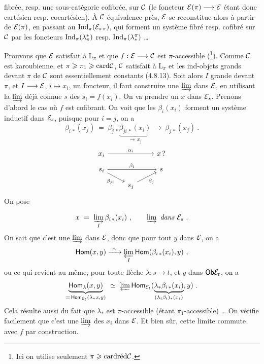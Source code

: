 fibrée, resp. une sous-catégorie cofibrée, sur $\cC$ (le foncteur $\cE(\pi) \longrightarrow \cE$ étant donc cartésien resp. cocartésien). À $\cC$-équivalence près, $\cE$ se reconstitue alors à partir de $\cE(\pi)$, en passant au $\Ind_{\pi}(\cE_{s\,\pi})$, qui forment un système fibré resp. cofibré sur $\cC$ par les foncteurs $\Ind_{\pi}(\lambda^*_{\pi})$ resp. $\Ind_{\pi}(\lambda^{\pi}_*)$ \dots

Prouvons que $\cE$ satisfait à $\mathrm{L}_{\pi}$ et que $f : \cE \longrightarrow \cC$ est $\pi$-accessible (\footnote[182]{Ici on utilise seulement $\pi \geqslant \card \red \cC$.}). Comme $\cC$ est karoubienne, et $\pi \geqslant \pi_1 \geqslant \card \cC$, $\cC$ satisfait à $\mathrm{L}_{\pi}$ et les ind-objets grands devant $\pi$ de $\cC$ sont essentiellement constants (4.8.13). Soit alors $I$ grande devant $\pi$, et $I \longrightarrow \cE$, $i \longmapsto x_i$, un foncteur, il faut construire une $\varinjlim$ dans $\cE$, en utilisant la $\varinjlim$ déjà connue $s$ des $s_i = f(x_i)$. On va prendre un $x$ dans $\cE_s$. Prenons d'abord le cas où $f$ est cofibrant. On voit que les $\beta_i(x_i)$ forment un système inductif dans $\cE_s$, puisque pour $i = j$, on a
\[
\beta_{i\,*}(x_j) \ = \ \beta_{j\,*} \underbrace{\beta_{ji\,*}(x_i)}_{\longrightarrow \, x_j} \ \longrightarrow \ \beta_{j\,*}(x_j) \ . %
\]
\[
\begin{tikzcd}[row sep=small]
x_i \arrow[rr, "\alpha_i"] & & x \, ? \\
s_i \arrow[rr, "\beta_i"] \arrow[dr, "\beta_{ji}"'] & & s \\
& s_j \arrow[ur, "\beta_j"'] &
\end{tikzcd}
\]
On pose

\[
x \ = \ \varinjlim_{I} \beta_{i\,*}(x_i) \ , \qquad \varinjlim \ \textit{dans } \cE_s \ .
\]
On sait que c'est une $\varinjlim$ dans $\cE$, donc que pour tout $y$ dans $\cE$, on a
\[
\Hom(x, y) \xrightarrow{\ \sim\ } \varprojlim_{I} \Hom(\beta_{i\,*}(x_i), y) \ ,
\]
ou ce qui revient au même, pour toute flèche $\lambda : s \longrightarrow t$, et $y$ dans $\Ob \cE_t$, on a
\[
\underbrace{\Hom_{\lambda}(x, y)}_{= \, \Hom_{\cE_t}(\lambda_* x, y)} \ \simeq \ \varprojlim \Hom_{\cE_t}(\underbrace{\lambda_* \beta_{i\,*}(x_i)}_{(\lambda_i \beta_i)_*(x_i)}, y) \ .
\]
Cela résulte aussi du fait que $\lambda_*$ est $\pi$-accessible (étant $\pi_1$-accessible) \dots{} On vérifie facilement que c'est une $\varinjlim$ des $x_i$ dans $\cE$. Et bien sûr, cette limite commute avec $f$ par construction.

